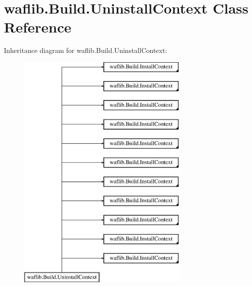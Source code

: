 \hypertarget{classwaflib_1_1_build_1_1_uninstall_context}{}\section{waflib.\+Build.\+Uninstall\+Context Class Reference}
\label{classwaflib_1_1_build_1_1_uninstall_context}
Inheritance diagram for waflib.\+Build.\+Uninstall\+Context\+:\begin{figure}[H]
\begin{center}
\leavevmode
\includegraphics[height=12.000000cm]{classwaflib_1_1_build_1_1_uninstall_context}
\end{center}
\end{figure}
